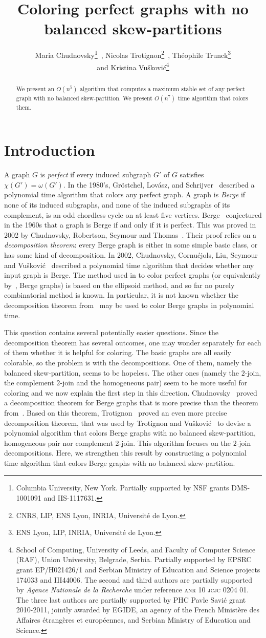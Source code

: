 \documentclass[11 pt] {article}
\title{Coloring perfect graphs with no balanced skew-partitions}
\author{Maria Chudnovsky\thanks{Columbia University, New
    York. Partially supported by NSF grants DMS-1001091 and
    IIS-1117631.}~, Nicolas Trotignon\thanks{CNRS, LIP, ENS Lyon,
    INRIA, Universit\'e de Lyon.}~, Th\'eophile Trunck\thanks{ENS Lyon,
    LIP, INRIA, Universit\'e de Lyon.}\\ and Kristina Vu\v
  skovi\'c\thanks{School of Computing, University of Leeds, and
    Faculty of Computer Science (RAF), Union University, Belgrade,
    Serbia.  Partially supported by EPSRC grant EP/H021426/1 and
    Serbian Ministry of Education and Science projects 174033 and
    III44006.  \newline The second and third authors are partially
    supported by \emph{Agence Nationale de la Recherche} under
    reference \textsc{anr 10 jcjc 0204 01}. The three last authors are
    partially supported by PHC Pavle Savi\'c grant 2010-2011, jointly
    awarded by EGIDE, an agency of the French Minist\`ere des Affaires
    \'etrang\`eres et europ\'eennes, and Serbian Ministry of Education
    and Science.}}
\begin{document}
\maketitle

\begin{abstract}
  We present an $O(n^5)$ algorithm that computes a maximum stable set
  of any perfect graph with no balanced skew-partition.  We present
  $O(n^7)$ time algorithm that colors them.
\end{abstract}


\section{Introduction}

A graph $G$ is \emph{perfect} if every induced subgraph $G'$ of $G$
satisfies $\chi(G') = \omega(G')$.  In the 1980's, Gr\"ostchel,
Lov\'asz, and Schrijver~\cite{gls:color} described a polynomial time
algorithm that colors any perfect graph.  A graph is \emph{Berge} if
none of its induced subgraphs, and none of the induced subgraphs of its
complement, is an odd chordless cycle on at least five vertices.
Berge~\cite{berge:61} conjectured in the 1960s that a graph is Berge
if and only if it is perfect.  This was proved in 2002 by Chudnovsky,
Robertson, Seymour and Thomas~\cite{CRST}.  Their proof relies on a
\emph{decomposition theorem}: every Berge graph is either in some
simple basic class, or has some kind of decomposition.  In 2002,
Chudnovsky, Cornu\'ejols, Liu, Seymour and Vu\v
skovi\'c~\cite{chudnovsky.c.l.s.v:reco} described a polynomial time
algorithm that decides whether any input graph is Berge.  The method
used in \cite{gls:color} to color perfect graphs (or equivalently
by~\cite{CRST}, Berge graphs) is based on the ellipsoid method,
and so far no purely combinatorial method is known.  In particular, it
is not known whether the decomposition theorem from~\cite{CRST} may be
used to color Berge graphs in polynomial time.

This question contains several potentially easier questions.  Since
the decomposition theorem has several outcomes, one may wonder
separately for each of them whether it is helpful for coloring.  The
basic graphs are all easily colorable, so the problem is with the
decompositions.  One of them, namely the balanced skew-partition,
seems to be hopeless.  The other ones (namely the $2$-join, the
complement $2$-join and the homogeneous pair) seem to be more useful
for coloring and we now explain the first step in this direction.
Chudnovsky~\cite{thesis,trigraphs} proved a decomposition theorem for
Berge graphs that is more precise than the theorem from~\cite{CRST}.
Based on this theorem, Trotignon~\cite{nicolas:bsp} proved an even
more precise decomposition theorem, that was used by Trotignon and
Vu\v skovi\'c~\cite{nicolas.kristina:2-join} to devise a polynomial
algorithm that colors Berge graphs with no balanced skew-partition,
homogeneous pair nor complement $2$-join.  This algorithm focuses on
the $2$-join decompositions.  Here, we strengthen this result by
constructing a polynomial time algorithm that colors Berge graphs with
no balanced skew-partition.
\end{document}
